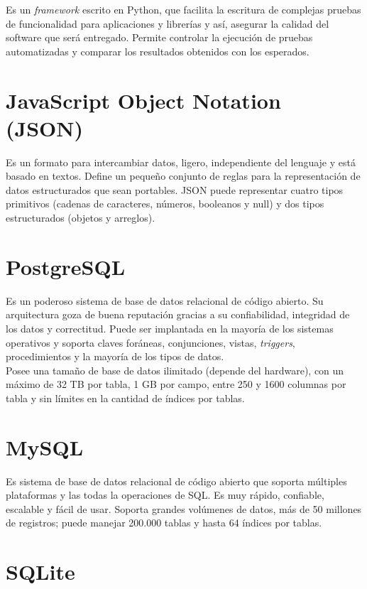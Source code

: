 Es un \textit{framework} escrito en Python, que facilita la escritura de complejas pruebas de funcionalidad para aplicaciones y librerías y así, asegurar la calidad del software que será entregado. Permite controlar la ejecución de pruebas automatizadas y comparar los resultados obtenidos con los esperados. \cite{pytest}

\section{JavaScript Object Notation (JSON)}

Es un formato para intercambiar datos, ligero, independiente del lenguaje y está basado en textos. Define un pequeño conjunto de reglas para la representación de datos estructurados que sean portables. JSON puede representar cuatro tipos primitivos (cadenas de caracteres, números, booleanos y null) y dos tipos estructurados (objetos y arreglos). \cite{JSON}

\section{PostgreSQL}

Es un poderoso sistema de base de datos relacional de código abierto. Su arquitectura goza de buena reputación gracias a su confiabilidad, integridad de los datos y correctitud. Puede ser implantada en la mayoría de los sistemas operativos y soporta claves foráneas, conjunciones, vistas, \textit{triggers}, procedimientos y la mayoría de los tipos de datos. \\

Posee una tamaño de base de datos ilimitado (depende del hardware), con un máximo de 32 TB por tabla, 1 GB por campo, entre 250 y 1600 columnas por tabla y sin límites en la cantidad de índices por tablas. \cite{PostgreSQL}

\section{MySQL}

Es sistema de base de datos relacional de código abierto que soporta múltiples plataformas y las todas la operaciones de SQL. Es muy rápido, confiable, escalable y fácil de usar. Soporta grandes volúmenes de datos, más de 50 millones de registros; puede manejar 200.000 tablas y hasta 64 índices por tablas. \cite{MySQL}

\section{SQLite}

